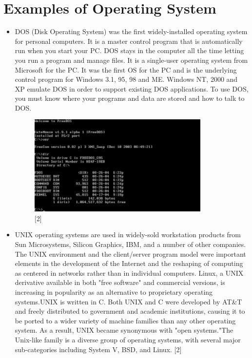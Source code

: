 \documentclass[11pt,a4paper]{article}
\begin{document}
	\section{Examples of Operating System}
	\begin{itemize}
		\item DOS (Disk Operating System) was the first widely-installed operating system for personal computers. It is a master control program that is automatically run when you start your PC. DOS stays in the computer all the time letting you run a program and manage files. It is a single-user operating system from Microsoft for the PC. It was the first OS for the PC and is the underlying control program for Windows 3.1, 95, 98 and ME. Windows NT, 2000 and XP emulate DOS in order to support existing DOS applications. To use DOS, you must know where your programs and data are stored and how to talk to DOS. 
			\begin{figure}[h!]
				\includegraphics[width=9cm]{dos.png}
				\centering
				\caption{[2]}
			\end{figure} 
		\item UNIX operating systems are used in widely-sold workstation products from Sun Microsystems, Silicon Graphics, IBM, and a number of other companies. The UNIX environment and the client/server program model were important elements in the development of the Internet and the reshaping of computing as centered in networks rather than in individual computers. Linux, a UNIX derivative available in both "free software" and commercial versions, is increasing in popularity as an alternative to proprietary operating systems.UNIX is written in C. Both UNIX and C were developed by AT\&T and freely distributed to government and academic institutions, causing it to be ported to a wider variety of machine families than any other operating system. As a result, UNIX became synonymous with "open systems."The Unix-like family is a diverse group of operating systems, with several major sub-categories including System V, BSD, and Linux. [2]
		\newpage
			\begin{figure}[h!]

\end{figure}
\end{itemize}
\end{document}

